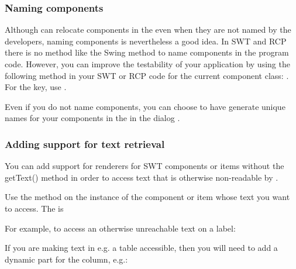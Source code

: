 
\subsubsection{Naming components}
Although \app{} can relocate components in the \gdaut{} even when they are not named by the developers, naming components is nevertheless a good idea. In SWT and RCP there is no method like the Swing  method to name components in the program code. However, you can improve the testability of your application by using the following method in your SWT or RCP code for the current component class: . For the key, use . 

Even if you do not name components, you can choose to have \app{} generate unique names for your components in the \gdaut{} in the \gdaut{} dialog . 

\subsubsection{Adding support for text retrieval}

You can add support for renderers for SWT components or items  without the getText() method in order to access text that is otherwise non-readable by \app{}. 

Use the method  on the instance of the component or item whose text you want to access. The  is 

For example, to access an otherwise unreachable text on a label:\\

If you are making text in e.g. a table accessible, then you will need to add a dynamic part for the column, e.g.:\\
